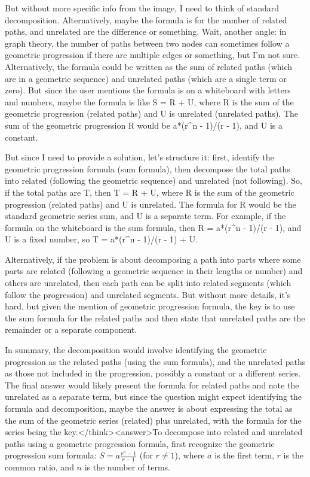 But without more specific info from the image, I need to think of standard decomposition. Alternatively, maybe the formula is for the number of related paths, and unrelated are the difference or something. Wait, another angle: in graph theory, the number of paths between two nodes can sometimes follow a geometric progression if there are multiple edges or something, but I'm not sure. Alternatively, the formula could be written as the sum of related paths (which are in a geometric sequence) and unrelated paths (which are a single term or zero). But since the user mentions the formula is on a whiteboard with letters and numbers, maybe the formula is like S = R + U, where R is the sum of the geometric progression (related paths) and U is unrelated (unrelated paths). The sum of the geometric progression R would be a*(r^n - 1)/(r - 1), and U is a constant.

But since I need to provide a solution, let's structure it: first, identify the geometric progression formula (sum formula), then decompose the total paths into related (following the geometric sequence) and unrelated (not following). So, if the total paths are T, then T = R + U, where R is the sum of the geometric progression (related paths) and U is unrelated. The formula for R would be the standard geometric series sum, and U is a separate term. For example, if the formula on the whiteboard is the sum formula, then R = a*(r^n - 1)/(r - 1), and U is a fixed number, so T = a*(r^n - 1)/(r - 1) + U.

Alternatively, if the problem is about decomposing a path into parts where some parts are related (following a geometric sequence in their lengths or number) and others are unrelated, then each path can be split into related segments (which follow the progression) and unrelated segments. But without more details, it's hard, but given the mention of geometric progression formula, the key is to use the sum formula for the related paths and then state that unrelated paths are the remainder or a separate component.

In summary, the decomposition would involve identifying the geometric progression as the related paths (using the sum formula), and the unrelated paths as those not included in the progression, possibly a constant or a different series. The final answer would likely present the formula for related paths and note the unrelated as a separate term, but since the question might expect identifying the formula and decomposition, maybe the answer is about expressing the total as the sum of the geometric series (related) plus unrelated, with the formula for the series being the key.</think><answer>To decompose into related and unrelated paths using a geometric progression formula, first recognize the geometric progression sum formula: \( S = a \frac{r^n - 1}{r - 1} \) (for \( r \neq 1 \)), where \( a \) is the first term, \( r \) is the common ratio, and \( n \) is the number of terms.  

